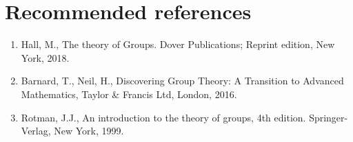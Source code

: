 \documentclass[12pt]{article}
\begin{document}
\newpage
\appendix

\section{Recommended references}
	\begin{enumerate}
	\item Hall, M., The theory of Groups. Dover Publications; Reprint edition, New York, 2018.
	\item Barnard, T., Neil, H., Discovering Group Theory: A Transition to Advanced Mathematics, Taylor \& Francis Ltd, London, 2016.
	\item Rotman, J.J., An introduction to the theory of groups, 4th edition. Springer-Verlag, New York, 1999.
	\end{enumerate}
\end{document}
